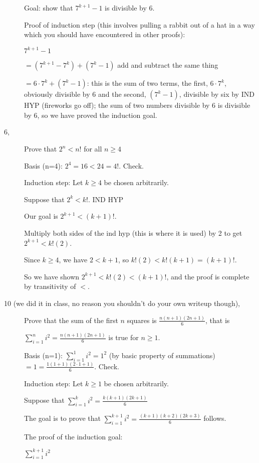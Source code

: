 \documentclass[12pt]{article}
\begin{document}
\begin{description}
Goal:  show that $7^{k+1}-1$ is divisible by 6.

Proof of induction step (this involves pulling a rabbit out of a hat in a way which you should have encountered in other proofs):

$7^{k+1}-1$

$= (7^{k+1}-7^k) + (7^k - 1)$  add and subtract the same thing

$ = 6\cdot 7^k + (7^k-1)$:  this is the sum of two terms, the first, $6\cdot 7^k$, obviously divisible by 6
and the second, $(7^k - 1)$, divisible by six by IND HYP (fireworks go off);  the sum of two numbers divisible by 6 is divisible by 6, so we have proved the induction goal.

\item[6,]  Prove that $2^n < n!$ for all $n \geq 4$

Basis (n=4):  $2^4 = 16 < 24 = 4!$.  Check.

Induction step:  Let $k \geq 4$ be chosen arbitrarily.

Suppose that $2^k < k!$.  IND HYP

Our goal is $2^{k+1} < (k+1)!$.

Multiply both sides of the ind hyp (this is where it is used) by 2 to get $2^{k+1}< k!(2)$.

Since $k\geq 4$, we have $2 < k+1$, so $k!(2) < k!(k+1) = (k+1)!$.

So we have shown $2^{k+1} < k!(2) < (k+1)!$, and the proof is complete by transitivity of $<$.



\item[10 (we did it in class, no reason you shouldn't do your own writeup though),]

Prove that the sum of the first $n$ squares is $\frac{n(n+1)(2n+1)}6$, that is

$\sum_{i=1}^n i^2 = \frac{n(n+1)(2n+1)}6$ is true for $n \geq 1$.

Basis (n=1):  $\sum_{i=1}^1 i^2 = 1^2$ (by basic property of summations) $= 1 = \frac{1(1+1)(2\cdot 1 +1)}6$.  Check.

Induction step: Let $k \geq 1$ be chosen arbitrarily.

Suppose that $\sum_{i=1}^k i^2 = \frac{k(k+1)(2k+1)}6$

The goal is to prove that $\sum_{i=1}^{k+1} i^2 = \frac{(k+1)(k+2)(2k+3)}6$ follows.

The proof of the induction goal:  

$\sum_{i=1}^{k+1} i^2$


\end{description}
\end{document}
